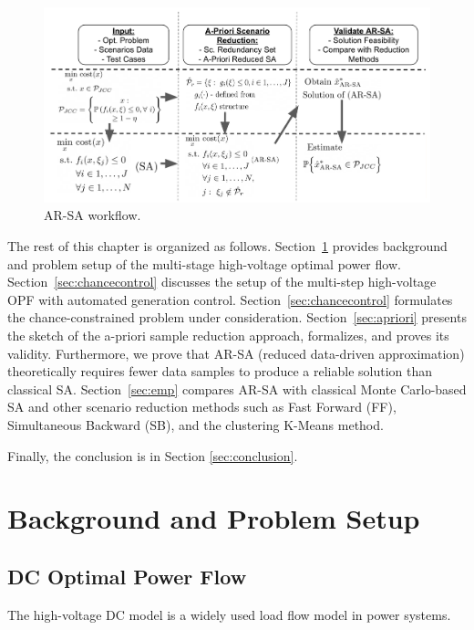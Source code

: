 \begin{figure}
    \centering
    \hspace{-2mm}\includegraphics[width=1.\textwidth]{Dissertation/images/dynamic//scheme.png}
    \caption{AR-SA workflow.}
    \label{fig:workflow}
    \vspace{-1mm}
\end{figure}

The rest of this chapter is organized as follows. Section~\ref{sec:setup} provides background and problem setup of the multi-stage high-voltage optimal power flow. Section~\ref{sec:chancecontrol} discusses the setup of the multi-step high-voltage OPF with automated generation control. Section~\ref{sec:chancecontrol} formulates the chance-constrained problem under consideration. Section~\ref{sec:apriori} presents the sketch of the a-priori sample reduction approach, formalizes, and proves its validity. Furthermore, we prove that AR-SA (reduced data-driven approximation) theoretically requires fewer data samples to produce a reliable solution than classical SA. Section~\ref{sec:emp} compares AR-SA with classical Monte Carlo-based SA and other scenario reduction methods such as Fast Forward (FF), Simultaneous Backward (SB), and the clustering K-Means method.

Finally, the conclusion is in Section \ref{sec:conclusion}.
\section{Background and Problem Setup}\label{sec:setup}
\subsection{DC Optimal Power Flow}
The high-voltage DC model is a widely used load flow model in power systems. 

